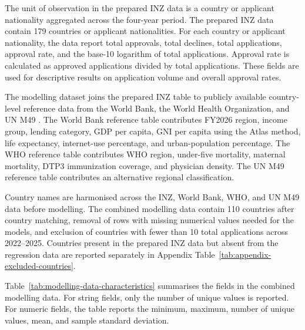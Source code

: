 \documentclass[runningheads]{llncs}
\begin{document}
The unit of observation in the prepared INZ data is a country or applicant nationality aggregated across the four-year period. The prepared INZ data contain 179 countries or applicant nationalities. For each country or applicant nationality, the data report total approvals, total declines, total applications, approval rate, and the base-10 logarithm of total applications. Approval rate is calculated as approved applications divided by total applications. These fields are used for descriptive results on application volume and overall approval rates.

The modelling dataset joins the prepared INZ table to publicly available country-level reference data from the World Bank, the World Health Organization, and UN M49 \cite{WorldBankWDI,WorldBankCLG,WHOData,WHOGHO,UNM49}. The World Bank reference table contributes FY2026 region, income group, lending category, GDP per capita, GNI per capita using the Atlas method, life expectancy, internet-use percentage, and urban-population percentage. The WHO reference table contributes WHO region, under-five mortality, maternal mortality, DTP3 immunization coverage, and physician density. The UN M49 reference table contributes an alternative regional classification.

Country names are harmonised across the INZ, World Bank, WHO, and UN M49 data before modelling. The combined modelling data contain 110 countries after country matching, removal of rows with missing numerical values needed for the models, and exclusion of countries with fewer than 10 total applications across 2022--2025. Countries present in the prepared INZ data but absent from the regression data are reported separately in Appendix Table~\ref{tab:appendix-excluded-countries}.

Table~\ref{tab:modelling-data-characteristics} summarises the fields in the combined modelling data. For string fields, only the number of unique values is reported. For numeric fields, the table reports the minimum, maximum, number of unique values, mean, and sample standard deviation.
\end{document}
